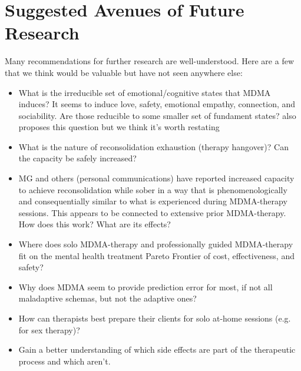 \documentclass[12pt,letterpaper]{book}
\begin{document}
\chapter{Suggested Avenues of Future Research}
Many recommendations for further research are well-understood. Here are a few that we think would be valuable but have not seen anywhere else:
\begin{itemize}
    \item What is the irreducible set of emotional/cognitive states that MDMA induces? It seems to induce love, safety, emotional empathy, connection, and sociability. Are those reducible to some smaller set of fundament states? \textcite{regan2021Connection} also proposes this question but we think it's worth restating
    \item What is the nature of reconsolidation exhaustion (therapy hangover)? Can the capacity be safely increased?
    \item MG and others (personal communications) have reported increased capacity to achieve reconsolidation while sober in a way that is phenomenologically and consequentially similar to what is experienced during MDMA-therapy sessions. This appears to be connected to extensive prior MDMA-therapy. How does this work? What are its effects?
    \item Where does solo MDMA-therapy and professionally guided MDMA-therapy fit on the mental health treatment Pareto Frontier of cost, effectiveness, and safety?
    \item Why does MDMA seem to provide prediction error for most, if not all maladaptive schemas, but not the adaptive ones?
    \item How can therapists best prepare their clients for solo at-home sessions (e.g. for sex therapy)?
    \item Gain a better understanding of which side effects are part of the therapeutic process and which aren't.
\end{itemize}
\backmatter
\printbibliography
{}
\end{document}
